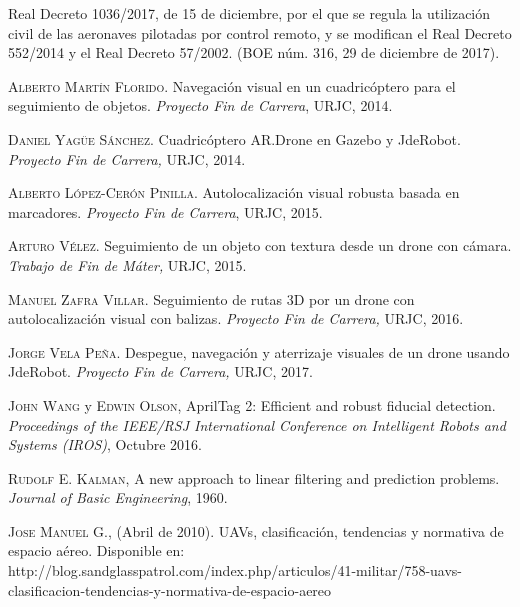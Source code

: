 \documentclass[a4paper, 12pt, oneside]{book}
\begin{document}
\lhead[]{}







\begin{thebibliography}{X}
 Real Decreto 1036/2017, de 15 de diciembre, por el que se regula la utilización 
civil  de  las  aeronaves  pilotadas  por  control  remoto,  y  se  modifican  el  Real  
Decreto 552/2014 y el Real Decreto 57/2002. (BOE núm. 316, 29 de diciembre de 2017).

 \textsc{Alberto Martín Florido.} Navegación visual en un cuadricóptero para el seguimiento de objetos. \textit{Proyecto Fin de Carrera}, URJC, 2014.	

 \textsc{Daniel Yagüe Sánchez.} Cuadricóptero AR.Drone en Gazebo y JdeRobot. \textit{Proyecto Fin de Carrera,} URJC, 2014.

 \textsc{Alberto López-Cerón Pinilla.} Autolocalización visual robusta basada en marcadores. \textit{Proyecto Fin de Carrera}, URJC, 2015.

 \textsc{Arturo Vélez.}  Seguimiento de un objeto con textura desde un drone con cámara. \textit{Trabajo de Fin de Máter,} URJC, 2015.

 \textsc{Manuel Zafra Villar.} Seguimiento de rutas 3D por un drone con autolocalización visual con balizas. \textit{Proyecto Fin de Carrera,} URJC, 2016.

 \textsc{Jorge Vela Peña.} Despegue, navegación y aterrizaje visuales de un drone usando JdeRobot. \textit{Proyecto Fin de Carrera,} URJC, 2017. 

 \textsc{John Wang} y \textsc{Edwin Olson}, AprilTag 2: Efficient and robust fiducial detection. \textit{Proceedings of the IEEE/RSJ International Conference on Intelligent Robots and Systems (IROS)}, Octubre 2016.
	
 \textsc{Rudolf E. Kalman}, A new approach to linear filtering and prediction problems.
\textit{Journal of Basic Engineering}, 1960.

 \textsc{Jose Manuel G.}, (Abril de 2010). UAVs, clasificación, tendencias y normativa de espacio aéreo. Disponible en: \\ http://blog.sandglasspatrol.com/index.php/articulos/41-militar/758-uavs-clasificacion-tendencias-y-normativa-de-espacio-aereo

\end{thebibliography} 
\end{document}
